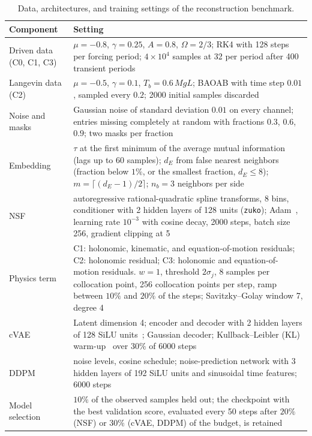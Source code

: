 \begin{table}[tb]
\caption{Data, architectures, and training settings of the reconstruction benchmark.}
\label{tab:hyper}
\PIARlayout{\renewcommand{\baselinestretch}{1}\footnotesize}{}%
\begin{ruledtabular}
\begin{tabular}{>{\raggedright\arraybackslash}p{}>{\raggedright\arraybackslash}p{}}
Component & Setting\\
\hline
Driven data (C0, C1, C3) & $\mu=-0.8$, $\gamma=0.25$, $A=0.8$, $\Omega=2/3$; RK4 with 128 steps per forcing period; $4\times10^{4}$ samples at 32 per period after 400 transient periods\\
Langevin data (C2) & $\mu=-0.5$, $\gamma=0.1$, $T_b=0.6\,MgL$; BAOAB with time step $0.01$, sampled every $0.2$; 2000 initial samples discarded\\
Noise and masks & Gaussian noise of standard deviation $0.01$ on every channel; entries missing completely at random with fractions $0.3$, $0.6$, $0.9$; two masks per fraction\\
Embedding & $\tau$ at the first minimum of the average mutual information (lags up to 60 samples); $d_E$ from false nearest neighbors (fraction below $1\%$, or the smallest fraction, $d_E\le8$); $m=\lceil(d_E-1)/2\rceil$; $n_b=3$ neighbors per side\\
NSF & 3 autoregressive rational-quadratic spline transforms, 8 bins, conditioner with 2 hidden layers of 128 units (\texttt{zuko}); Adam~\cite{KingmaBa2015}, learning rate $10^{-3}$ with cosine decay, 2000 steps, batch size 256, gradient clipping at 5\\
Physics term & C1: holonomic, kinematic, and equation-of-motion residuals; C2: holonomic residual; C3: holonomic and equation-of-motion residuals. $w=1$, threshold $2\sigma_j$, 8 samples per collocation point, 256 collocation points per step, ramp between $10\%$ and $20\%$ of the steps; Savitzky--Golay window 7, degree 4\\
cVAE & Latent dimension 4; encoder and decoder with 2 hidden layers of 128 SiLU units~\cite{Elfwing2018}; Gaussian decoder; Kullback--Leibler (KL) warm-up~\cite{Bowman2016} over $30\%$ of 6000 steps\\
DDPM & 100 noise levels, cosine schedule; noise-prediction network with 3 hidden layers of 192 SiLU units and sinusoidal time features; 6000 steps\\
Model selection & $10\%$ of the observed samples held out; the checkpoint with the best validation score, evaluated every 50 steps after $20\%$ (NSF) or $30\%$ (cVAE, DDPM) of the budget, is retained\\

\end{tabular}
\end{ruledtabular}
\end{table}
